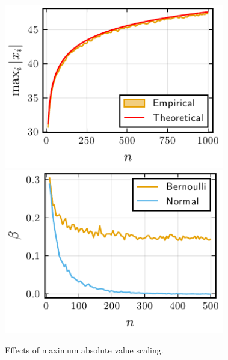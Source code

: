 \documentclass[10pt]{beamer}
\begin{document}
\begin{frame}[c]
\begin{columns}
\begin{column}{0.45\textwidth}
    \end{column}
    \begin{column}{0.45\textwidth}
      \begin{figure}[htpb]
        \centering
        \includegraphics[width=0.9\textwidth]{figures/maxabs_gev.pdf}
        \includegraphics[width=0.9\textwidth]{figures/maxabs_n.pdf}
        \caption{%
          Effects of maximum absolute value scaling.
        }
      \end{figure}
    \end{column}
  \end{columns}

\end{frame}
\end{document}
